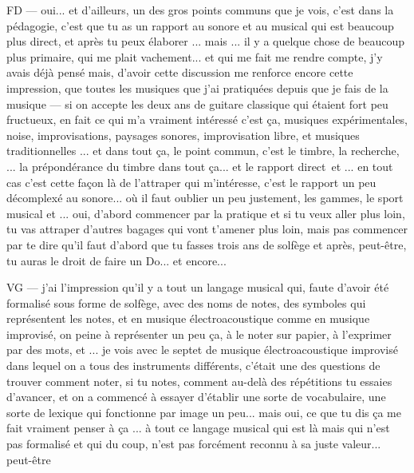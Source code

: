FD — oui... et d'ailleurs, un des gros points communs que je vois, c'est dans la pédagogie, c'est que tu as un rapport au sonore et au musical qui est beaucoup plus direct, et après tu peux élaborer ... mais ... il y a quelque chose de beaucoup plus primaire, qui me plait vachement... et qui me fait me rendre compte, j'y avais déjà pensé mais, d'avoir cette discussion me renforce encore cette impression, que toutes les musiques que j'ai pratiquées depuis que je fais de la musique — si on accepte les deux ans de guitare classique qui étaient fort peu fructueux, en fait ce qui m'a vraiment intéressé c'est ça, musiques expérimentales, noise, improvisations, paysages sonores, improvisation libre, et musiques traditionnelles ... et dans tout ça, le point commun, c'est le timbre, la recherche, ... la prépondérance du timbre dans tout ça... et le rapport direct et ... en tout cas c'est cette façon là de l'attraper  qui m'intéresse, c'est le rapport un peu décomplexé au sonore... où il faut oublier un peu justement, les gammes, le sport musical et ... oui, d'abord commencer par la pratique et si tu veux aller plus loin, tu vas attraper d'autres bagages qui vont t'amener plus loin, mais pas commencer par te dire qu'il faut d'abord que tu fasses trois ans de solfège et après, peut-être,  tu auras le droit de faire un Do... et encore... 

VG — j'ai l'impression qu'il y a tout un langage musical qui, faute d'avoir été formalisé sous forme de solfège, avec des noms de notes, des symboles qui représentent les notes, et en musique électroacoustique comme en musique improvisé, on peine à représenter un peu ça, à le noter sur papier, à l'exprimer par des mots, et ... je vois avec le septet de musique électroacoustique improvisé dans lequel on a tous des instruments différents, c'était une des questions de trouver comment noter, si tu notes, comment au-delà des répétitions tu essaies d'avancer, et on a commencé à essayer d'établir une sorte de vocabulaire, une sorte de lexique qui fonctionne par image un peu... mais oui, ce que tu dis ça me fait vraiment penser à ça ... à tout ce langage musical qui est là mais qui n'est pas formalisé et qui du coup, n'est pas forcément reconnu à sa juste valeur... peut-être 

